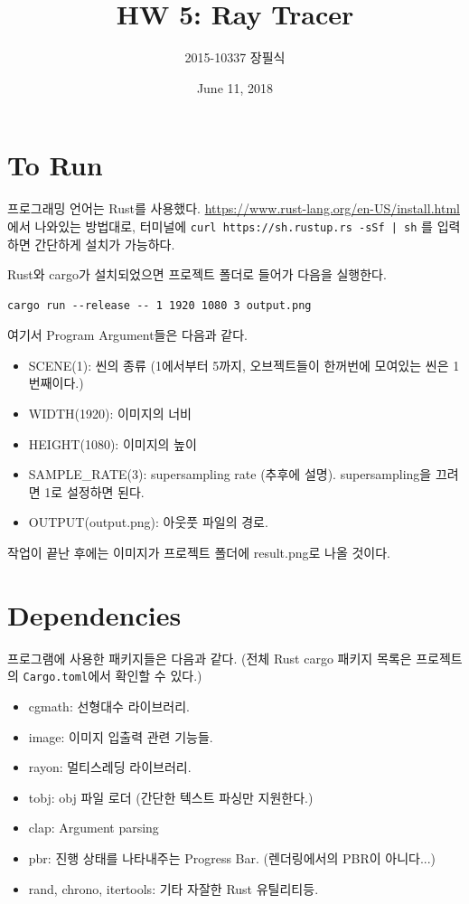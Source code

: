 \documentclass[11pt, a4paper]{article}
\title{HW 5: Ray Tracer}
\author{2015-10337 장필식}
\date{June 11, 2018}
\begin{document}
\maketitle

\section{To Run}

프로그래밍 언어는 Rust를 사용했다. 
\url{https://www.rust-lang.org/en-US/install.html}에서 나와있는 방법대로, 터미널에 \texttt{curl https://sh.rustup.rs -sSf | sh} 를 입력하면 간단하게 설치가 가능하다.

Rust와 cargo가 설치되었으면 프로젝트 폴더로 들어가 다음을 실행한다.

\begin{verbatim}
cargo run --release -- 1 1920 1080 3 output.png
\end{verbatim}

여기서 Program Argument들은 다음과 같다.

\begin{itemize}
  \item SCENE(1): 씬의 종류 (1에서부터 5까지, 오브젝트들이 한꺼번에 모여있는 씬은 1번째이다.)
  \item WIDTH(1920): 이미지의 너비
  \item HEIGHT(1080): 이미지의 높이
  \item SAMPLE\_RATE(3): supersampling rate (추후에 설명). supersampling을 끄려면 1로 설정하면 된다.
  \item OUTPUT(output.png): 아웃풋 파일의 경로.
\end{itemize}

작업이 끝난 후에는 이미지가 프로젝트 폴더에 result.png로 나올 것이다.

\section{Dependencies}

프로그램에 사용한 패키지들은 다음과 같다. (전체 Rust cargo 패키지 목록은 프로젝트의 \texttt{Cargo.toml}에서 확인할 수 있다.)

\begin{itemize}
  \item cgmath: 선형대수 라이브러리.
  \item image: 이미지 입출력 관련 기능들.
  \item rayon: 멀티스레딩 라이브러리.
  \item tobj: obj 파일 로더 (간단한 텍스트 파싱만 지원한다.)
  \item clap: Argument parsing
  \item pbr: 진행 상태를 나타내주는 Progress Bar. (렌더링에서의 PBR이 아니다...)
  \item rand, chrono, itertools: 기타 자잘한 Rust 유틸리티등.
\end{itemize}
\end{document}
